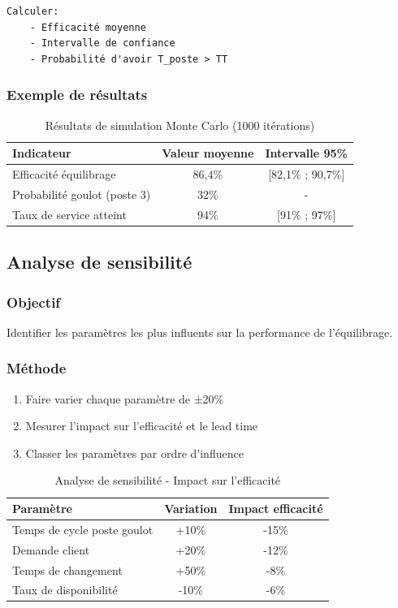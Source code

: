\documentclass[12pt,a4paper]{article}
\begin{document}
\begin{center}
\begin{verbatim}
Calculer:
    - Efficacité moyenne
    - Intervalle de confiance
    - Probabilité d'avoir T_poste > TT
\end{verbatim}

\subsubsection{Exemple de résultats}

\begin{table}[H]
\centering
\caption{Résultats de simulation Monte Carlo (1000 itérations)}
\label{tab:monte_carlo}
\begin{tabular}{|l|c|c|}
\hline
\textbf{Indicateur} & \textbf{Valeur moyenne} & \textbf{Intervalle 95\%} \\ \hline
Efficacité équilibrage & 86,4\% & [82,1\% ; 90,7\%] \\
Probabilité goulot (poste 3) & 32\% & - \\
Taux de service atteint & 94\% & [91\% ; 97\%] \\
\hline
\end{tabular}
\end{table}

\subsection{Analyse de sensibilité}

\subsubsection{Objectif}
Identifier les paramètres les plus influents sur la performance de l'équilibrage.

\subsubsection{Méthode}
\begin{enumerate}
    \item Faire varier chaque paramètre de ±20\%
    \item Mesurer l'impact sur l'efficacité et le lead time
    \item Classer les paramètres par ordre d'influence
\end{enumerate}

\begin{table}[H]
\centering
\caption{Analyse de sensibilité - Impact sur l'efficacité}
\label{tab:sensibilite}
\begin{tabular}{|l|c|c|}
\hline
\textbf{Paramètre} & \textbf{Variation} & \textbf{Impact efficacité} \\ \hline
Temps de cycle poste goulot & +10\% & -15\% \\
Demande client & +20\% & -12\% \\
Temps de changement & +50\% & -8\% \\
Taux de disponibilité & -10\% & -6\% \\
\hline
\end{tabular}
\end{table}


\end{center}
\end{document}
